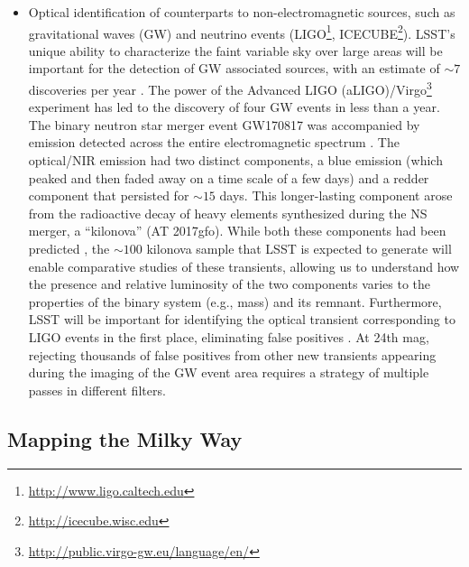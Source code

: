 \begin{itemize}
\item Optical identification of counterparts to non-electromagnetic
  sources, such as gravitational waves (GW) and neutrino events
  (LIGO\footnote{\url{http://www.ligo.caltech.edu}},
  ICECUBE\footnote{\url{http://icecube.wisc.edu}}).  LSST's unique ability
  to characterize the faint variable sky over large areas will be
  important for the detection of GW associated sources, with an estimate
  of $\sim 7$ discoveries per year \citep{2018ApJ...852L...3S}.  The power
  of the Advanced LIGO
  (aLIGO)/Virgo\footnote{\url{http://public.virgo-gw.eu/language/en/}}
  experiment has led to the discovery
  of four GW events in less than a year. The binary
  neutron star merger event GW170817 was accompanied by emission
  detected across the entire electromagnetic spectrum \citep{2017ApJ...848L..12A}.
The optical/NIR emission had two distinct components, a blue emission
(which peaked and then faded away
on a time scale of a few days) and a redder component  that persisted
for $\sim 15$ days.  This longer-lasting component arose from the radioactive decay of heavy elements
synthesized during the NS merger, a ``kilonova'' (AT 2017gfo).
While both these components had been predicted \citep{2017LRR....20....3M},
the $\sim  100$ kilonova sample that LSST is expected to generate will
enable comparative studies of these transients, allowing us to
understand how  the presence and relative luminosity of the two
components varies to the properties of the binary system (e.g., mass)
and its remnant.
  Furthermore, LSST will be important for identifying the optical transient
  corresponding to LIGO events in the first place, eliminating false
  positives \citep{2013ApJ...767..124N,2012ApJ...746...48M,2015ApJ...814...25C, 2017ApJ...849...12C}.  %
  At 24th
  mag, rejecting thousands of false positives from other new
  transients appearing during the imaging of the GW event area
  requires a strategy of multiple passes in different filters.

\end{itemize}


\subsection{Mapping the Milky Way }

